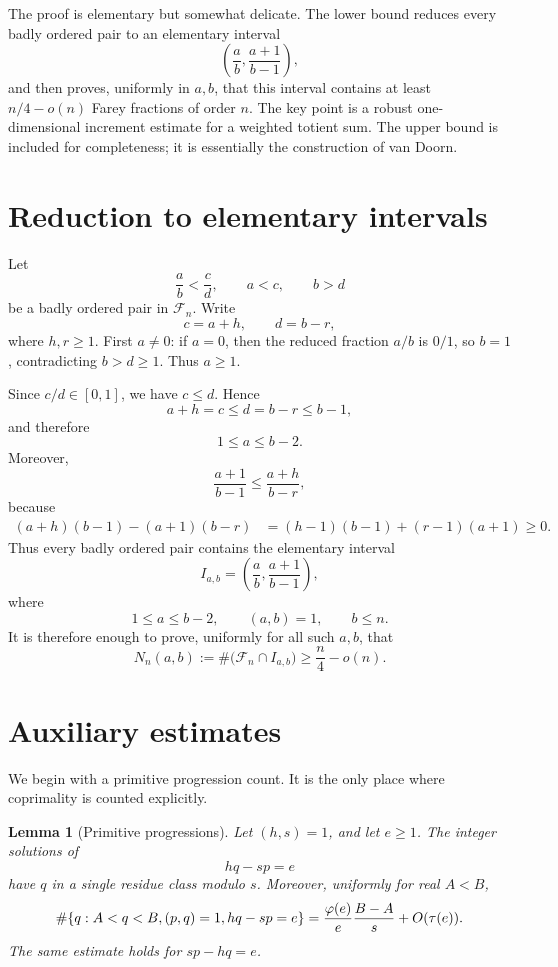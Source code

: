 \documentclass[11pt]{article}
\numberwithin{equation}{section}
\newtheorem{lemma}[theorem]{Lemma}
\theoremstyle{definition}
\theoremstyle{remark}
\newcommand{\Fn}{\mathcal F_n}
\newcommand{\1}{\mathbf 1}
\begin{document}
The proof is elementary but somewhat delicate.  The lower bound reduces every badly ordered pair to an elementary interval
\[
  \left(\frac ab,\frac{a+1}{b-1}\right),
\]
and then proves, uniformly in $a,b$, that this interval contains at least $n/4-o(n)$ Farey fractions of order $n$.  The key point is a robust one-dimensional increment estimate for a weighted totient sum.  The upper bound is included for completeness; it is essentially the construction of van Doorn.

\section{Reduction to elementary intervals}

Let
\[
  \frac ab<\frac cd,
  \qquad a<c,
  \qquad b>d
\]
be a badly ordered pair in $\Fn$.  Write
\[
  c=a+h,
  \qquad d=b-r,
\]
where $h,r\ge1$.  First $a\ne0$: if $a=0$, then the reduced fraction $a/b$ is $0/1$, so $b=1$, contradicting $b>d\ge1$.  Thus $a\ge1$.

Since $c/d\in[0,1]$, we have $c\le d$.  Hence
\[
  a+h=c\le d=b-r\le b-1,
\]
and therefore
\[
  1\le a\le b-2.
\]
Moreover,
\[
  \frac{a+1}{b-1}\le \frac{a+h}{b-r},
\]
because
\begin{align*}
  (a+h)(b-1)-(a+1)(b-r)
    &=(h-1)(b-1)+(r-1)(a+1)\ge0.
\end{align*}
Thus every badly ordered pair contains the elementary interval
\[
  I_{a,b}=\left(\frac ab,\frac{a+1}{b-1}\right),
\]
where
\[
  1\le a\le b-2,
  \qquad (a,b)=1,
  \qquad b\le n.
\]
It is therefore enough to prove, uniformly for all such $a,b$, that
\[
  N_n(a,b):=\#\bigl(\Fn\cap I_{a,b}\bigr)
  \ge \frac n4-o(n). \tag{2.1}\label{eq:target}
\]

\section{Auxiliary estimates}

We begin with a primitive progression count.  It is the only place where coprimality is counted explicitly.

\begin{lemma}[Primitive progressions]\label{lem:primitive-progression}
Let $(h,s)=1$, and let $e\ge1$.  The integer solutions of
\[
  hq-sp=e
\]
have $q$ in a single residue class modulo $s$.  Moreover, uniformly for real $A<B$,
\[
\#\{q:A<q<B,\\ (p,q)=1,\\ hq-sp=e\}
 =\frac{\varphi(e)}e\frac{B-A}{s}+O(\tau(e)).
\]
The same estimate holds for $sp-hq=e$.
\end{lemma}
\end{document}
